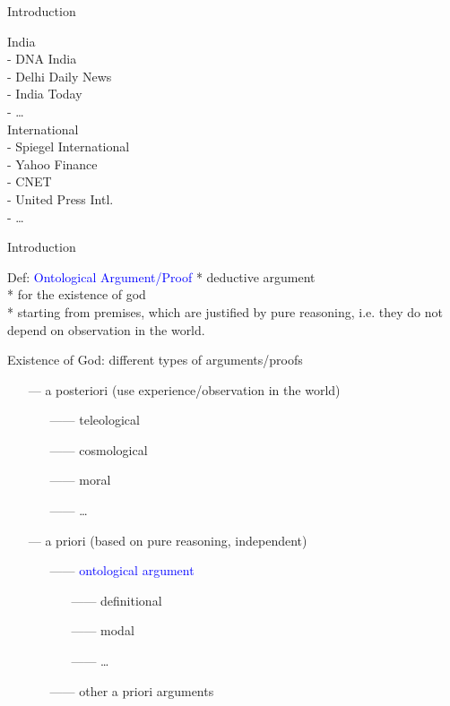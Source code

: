 \begin{frame}{Introduction}
\begin{minipage}{.3\textwidth}
India \\
- DNA India \\
- Delhi Daily News \\
- India Today \\
- \ldots \\

International \\
- Spiegel International \\
- Yahoo Finance \\
- CNET \\
- United Press Intl. \\
- \ldots
\end{minipage}
\end{frame}


\begin{frame}{Introduction}\large
\begin{block}{Def: \textcolor{blue}{Ontological Argument/Proof}}
* deductive argument \\

* for the existence of god \\

* starting from premises, which are justified by pure reasoning,
i.e. they do not depend on observation in the world.
\end{block}

\vfill \pause
Existence of God: different types of arguments/proofs\\[.2em]
\begin{itemize}
\item[---]a posteriori (use experience/observation in the world)
  \begin{itemize}
  \item[------]teleological
  \item[------]cosmological
  \item[------]moral
  \item[------] \ldots
  \end{itemize}  
\item[---]a priori (based on pure reasoning, independent)
  \begin{itemize}
  \item[------]\textcolor{blue}{ontological argument}
    \begin{itemize}
    \item[------]definitional 
    \item[------]modal 
    \item[------] \ldots
    \end{itemize}
  \item[------]other a priori arguments
  \end{itemize}
\end{itemize}
\end{frame}


